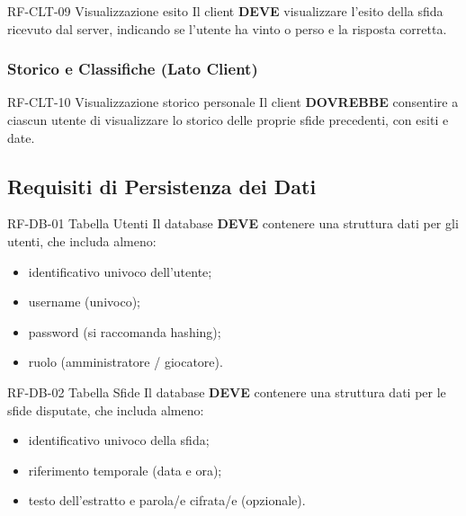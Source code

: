 \documentclass[12pt, a4paper]{article}
\newcommand{\mustshall}{\textbf{DEVE}}
\newcommand{\should}{\textbf{DOVREBBE}}
\begin{document}
\begin{reqbox}{RF-CLT-09 \quad Visualizzazione esito \quad [MUST]}
Il client \mustshall{} visualizzare l'esito della sfida ricevuto dal server, indicando se l'utente ha vinto o perso e la risposta corretta.
\end{reqbox}

\subsubsection{Storico e Classifiche (Lato Client)}

\begin{reqbox}{RF-CLT-10 \quad Visualizzazione storico personale \quad [SHOULD]}
Il client \should{} consentire a ciascun utente di visualizzare lo storico delle proprie sfide precedenti, con esiti e date.
\end{reqbox}

\subsection{Requisiti di Persistenza dei Dati}

\begin{reqbox}{RF-DB-01 \quad Tabella Utenti \quad [MUST]}
Il database \mustshall{} contenere una struttura dati per gli utenti, che includa almeno:
\begin{itemize}
    \item identificativo univoco dell'utente;
    \item username (univoco);
    \item password (si raccomanda hashing);
    \item ruolo (amministratore / giocatore).
\end{itemize}
\end{reqbox}

\begin{reqbox}{RF-DB-02 \quad Tabella Sfide \quad [MUST]}
Il database \mustshall{} contenere una struttura dati per le sfide disputate, che includa almeno:
\begin{itemize}
    \item identificativo univoco della sfida;
    \item riferimento temporale (data e ora);
    \item testo dell'estratto e parola/e cifrata/e (opzionale).
\end{itemize}
\end{reqbox}
\end{document}
